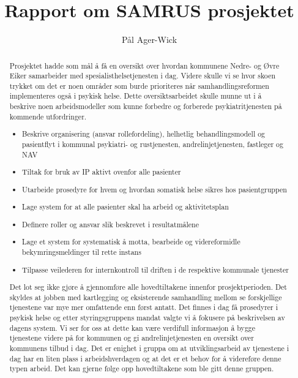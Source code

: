\documentclass[11pt]{report} %
\title{Rapport om SAMRUS prosjektet}
\author{Pål Ager-Wick}
\begin{document}
\pagecolor{f_page}\afterpage{\nopagecolor}
\maketitle



              \renewcommand{\abstractname}{Oppsummering}

              \begin{abstract}Prosjektet hadde som mål å få en oversikt over hvordan kommunene Nedre- og Øvre Eiker samarbeider med spesialisthelsetjenesten i dag. Videre skulle vi se hvor skoen trykket om det er noen områder som burde prioriteres når samhandlingsreformen implementeres også i psykisk helse. Dette oversiktsarbeidet skulle munne ut i å beskrive noen arbeidsmodeller som kunne forbedre og forberede psykiatritjenesten på kommende utfordringer. 

              \begin{itemize}
                \item Beskrive organisering (ansvar rollefordeling), helhetlig behandlingsmodell og pasientflyt i kommunal psykiatri- og rustjenesten, andrelinjetjenesten, fastleger og NAV
                \item Tiltak for bruk av IP aktivt ovenfor alle pasienter
                \item Utarbeide prosedyre for hvem og hvordan somatisk helse sikres hos pasientgruppen
                \item Lage system for at alle pasienter skal ha arbeid og aktivitetsplan
                \item Definere roller og ansvar slik beskrevet i resultatmålene
                \item Lage et system for systematisk å motta, bearbeide og videreformidle bekymringsmeldinger til rette instans
                \item Tilpasse veilederen for internkontroll til driften i de respektive kommunale tjenester
              \end{itemize}
              Det lot seg ikke gjøre å gjennomføre alle hovedtiltakene innenfor prosjektperioden. Det skyldes at jobben med kartlegging og eksisterende samhandling mellom se forskjellige tjenestene var mye mer omfattende enn først antatt. Det finnes i dag få prosedyrer i psykisk helse og etter styringsgruppens mandat valgte vi å fokusere på beskrivelsen av dagens system. Vi ser for oss at dette kan være verdifull informasjon å bygge tjenestene videre på for kommunen og gi andrelinjetjenesten en oversikt over kommunens tilbud i dag. Det er enighet i gruppa om at utviklingsarbeid av tjenestene i dag har en liten plass i arbeidshverdagen og at det er et behov for å videreføre denne typen arbeid. Det kan gjerne følge opp hovedtiltakene som ble gitt denne gruppen.

              \end{abstract}
\end{document}
